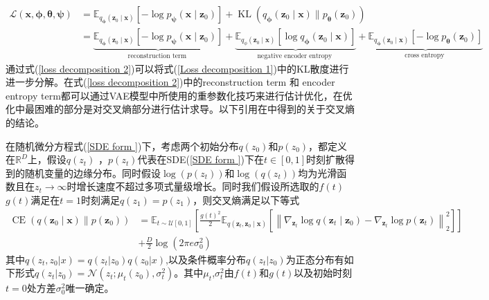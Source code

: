 \begin{align}
 \mathcal{L}(\mathbf{x}, \boldsymbol{\phi}, \boldsymbol{\theta}, \boldsymbol{\psi})&=\mathbb{E}_{q_{\boldsymbol{\phi}}\left(\mathbf{z}_0 \mid \mathbf{x}\right)}\left[-\log p_{\boldsymbol{\psi}}\left(\mathbf{x} \mid \mathbf{z}_0\right)\right]+\operatorname{KL}\left(q_{\boldsymbol{\phi}}\left(\mathbf{z}_0 \mid \mathbf{x}\right) \| p_{\boldsymbol{\theta}}\left(\mathbf{z}_0\right)\right) \label{Loss decomposition 1}\\
& =\underbrace{\mathbb{E}_{q_{\boldsymbol{\phi}}\left(\mathbf{z}_0 \mid \mathbf{x}\right)}\left[-\log p_{\boldsymbol{\psi}}\left(\mathbf{x} \mid \mathbf{z}_0\right)\right]}_{\text {reconstruction term }}+\underbrace{\mathbb{E}_{q_\phi\left(\mathbf{z}_0 \mid \mathbf{x}\right)}\left[\log q_{\boldsymbol{\phi}}\left(\mathbf{z}_0 \mid \mathbf{x}\right)\right]}_{\text {negative encoder entropy }}+\underbrace{\mathbb{E}_{q_{\boldsymbol{\phi}}\left(\mathbf{z}_0 \mid \mathbf{x}\right)}\left[-\log p_{\boldsymbol{\theta}}\left(\mathbf{z}_0\right)\right]}_{\text {cross entropy }} \label{loss decomposition 2}
\end{align}
通过式(\ref{loss decomposition 2})可以将式(\ref{Loss decomposition 1})中的KL散度进行进一步分解。在式(\ref{loss decomposition 2})中的reconstruction term 和 encoder entropy term都可以通过VAE模型中所使用的重参数化技巧来进行估计优化，在优化中最困难的部分是对交叉熵部分进行估计求导。以下引用在\cite{VAE_diffusion}中得到的关于交叉熵的结论。
\begin{theorem}
在随机微分方程式(\ref{SDE form })下，考虑两个初始分布$q(z_0)$和$p(z_0)$，都定义在$\mathbb{R}^{D}$上，假设$q(z_t)$ ，$p(z_t)$代表在SDE(\ref{SDE form })下在$t\in [0,1]$时刻扩散得到的随机变量的边缘分布。同时假设$\log(p(z_t))$和$\log(q(z_t))$均为光滑函数且在$z_t\to \infty$时增长速度不超过多项式量级增长。同时我们假设所选取的$f(t)$
$g(t)$满足在$t=1$时刻满足$q(z_1)=p(z_1)$，则交叉熵满足以下等式
\begin{align}
    \operatorname{CE}\left(q\left(\mathbf{z}_0 \mid \mathbf{x}\right) \| p\left(\mathbf{z}_0\right)\right) &=\mathbb{E}_{t \sim \mathcal{U}[0,1]}\left[\frac{g(t)^2}{2} \mathbb{E}_{q\left(\mathbf{z}_t, \mathbf{z}_0 \mid \mathbf{x}\right)}\left[\left\|\nabla_{\mathbf{z}_t} \log q\left(\mathbf{z}_t \mid \mathbf{z}_0\right)-\nabla_{\mathbf{z}_t} \log p\left(\mathbf{z}_t\right)\right\|_2^2\right]\right] \nonumber\\
    &+\frac{D}{2} \log \left(2 \pi e \sigma_0^2\right) \label{thm 1}
\end{align}
    其中$q(z_t,z_0|x) = q(z_t|z_0)q(z_0|x)$,以及条件概率分布$q(z_t|z_0)$为正态分布有如下形式$q(z_t|z_0)=\mathcal{N}(z_t;\mu_t(z_0),\sigma_t^2)$。其中$\mu_t$,$\sigma_t^2$由$f(t)$和$g(t)$以及初始时刻$t=0$处方差$\sigma_0^2$唯一确定。
\end{theorem}
